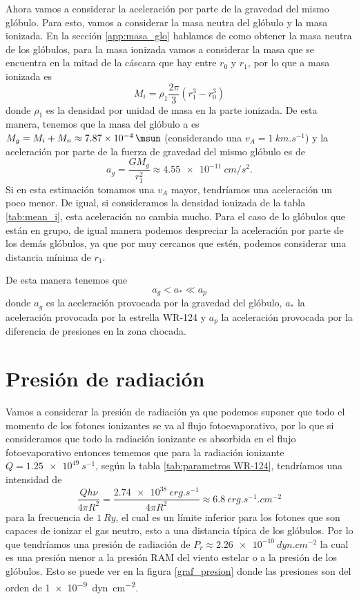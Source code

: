 \documentclass{book}
\begin{document}
Ahora vamos a considerar la aceleración por parte de la gravedad del mismo glóbulo. Para esto, vamos a considerar la masa neutra del glóbulo y la masa ionizada. En la sección \ref{app:masa_glo} hablamos de como obtener la masa neutra de los glóbulos, para la masa ionizada vamos a considerar la masa que se encuentra en la mitad de la cáscara que hay entre $r_0$ y $r_1$, por lo que a masa ionizada es
\begin{equation}
    M_i = \rho_1 \frac{2\pi}{3}(r_1^3-r_0^3)
\end{equation}
donde $\rho_1$ es la densidad por unidad de masa en la parte ionizada. De esta manera, tenemos que la masa del glóbulo a es $M_g = M_i + M_n \approx \SI{7.87e-4}{\msun}$ (considerando una $v_A=\SI{1}{km.s^{-1}}$) y la aceleración por parte de la fuerza de gravedad del mismo glóbulo es de
\begin{equation}
a_g=\frac{G M_g}{r_1^2}\approx \SI{4.55e-11}{cm/s^2}.
\end{equation}
Si en esta estimación tomamos una $v_A$ mayor, tendríamos una aceleración un poco menor. De igual, si consideramos la densidad ionizada de la tabla \ref{tab:mean_i}, esta aceleración no cambia mucho. Para el caso de lo glóbulos que están en grupo, de igual manera podemos despreciar la aceleración por parte de los demás glóbulos, ya que por muy cercanos que estén, podemos considerar una distancia mínima de $r_1$. 

De esta manera tenemos que
\begin{equation}
a_g<a_*\ll a_p
\end{equation}
donde $a_g$ es la aceleración provocada por la gravedad del glóbulo, $a_*$ la aceleración provocada por la estrella WR-124 y $a_p$ la aceleración provocada por la diferencia de presiones en la zona chocada.

\section{Presión de radiación}

Vamos a considerar la presión de radiación ya que podemos suponer que todo el momento de los fotones ionizantes se va al flujo fotoevaporativo, por lo que si consideramos que todo la radiación ionizante es absorbida en el flujo fotoevaporativo entonces tememos que para la radiación ionizante $Q = \SI{1.25e49}{s^{-1}}$, según la tabla \ref{tab:parametros WR-124}, tendríamos una intensidad de 
\begin{equation}
\frac{Q h\nu}{4\pi R^2} = \frac{\SI{2.74e38}{erg.s^{-1}}}{4\pi R^2} \approx \SI{6.8}{erg.s^{-1}.cm^{-2}}
\end{equation}
para la frecuencia de $\SI{1}{Ry}$, el cual es un límite inferior para los fotones que son capaces de ionizar el gas neutro, esto a una distancia típica de los glóbulos. Por lo que tendríamos una presión de radiación de $P_r\approx \SI{2.26e-10}{dyn.cm^{-2}}$ la cual es una presión menor a la presión RAM del viento estelar o a la presión de los glóbulos. Esto se puede ver en la figura \ref{graf_presion} donde las presiones son del orden de \SI{1e-9}{dyn.cm^{-2}}.
\end{document}
